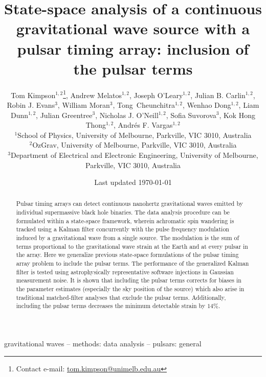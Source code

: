 \documentclass[fleqn,usenatbib,useAMS]{mnras}
\title[State-space PTA]{State-space analysis of a continuous gravitational wave source with a pulsar timing array: inclusion of the pulsar terms}
\author[Kimpson]{Tom Kimpson$^{1,2}$\thanks{Contact e-mail: \href{tom.kimpson@unimelb.edu.au}{tom.kimpson@unimelb.edu.au}}, Andrew Melatos$^{1,2}$, Joseph O'Leary$^{1,2}$, Julian B. Carlin$^{1,2}$, Robin J. Evans$^{3}$, \newauthor William Moran$^{3}$, Tong Cheunchitra$^{1,2}$, Wenhao Dong$^{1,2}$, Liam Dunn$^{1,2}$, Julian Greentree$^{3}$, Nicholas J. O'Neill$^{1,2}$, \newauthor Sofia Suvorova$^{3}$, Kok Hong Thong$^{1,2}$, Andrés F. Vargas$^{1,2}$%
\\
$^{1}$School of Physics, University of Melbourne, Parkville, VIC 3010, Australia \\
$^{2}$OzGrav, University of Melbourne, Parkville, VIC 3010, Australia \\
$^{3}$Department of Electrical and Electronic Engineering, University of Melbourne, Parkville, VIC 3010, Australia }
\date{Last updated \today}
\begin{document}
\label{firstpage}
\pagerange{\pageref{firstpage}--\pageref{lastpage}}
\maketitle

\begin{abstract}	
	 Pulsar timing arrays can detect continuous nanohertz gravitational waves emitted by individual supermassive black hole binaries. The data analysis procedure can be formulated within a state-space framework, wherein achromatic spin wandering is tracked using a Kalman filter concurrently with the pulse frequency modulation induced by a gravitational wave from a single source. The modulation is the sum of terms proportional to the gravitational wave strain at the Earth and at every pulsar in the array. Here we generalize previous state-space formulations of the pulsar timing array problem to include the pulsar terms. The performance of the generalized Kalman filter is tested using astrophysically representative software injections in Gaussian measurement noise. It is shown that including the pulsar terms corrects for biases in the parameter estimates (especially the sky position of the source) which also arise in traditional matched-filter analyses that exclude the pulsar terms. Additionally, including the pulsar terms decreases the minimum detectable strain by $14\%$.
\end{abstract}

\begin{keywords}
gravitational waves -- methods: data analysis -- pulsars: general
\end{keywords}



\begingroup
\let\clearpage\relax
\endgroup
\newpage
\end{document}
